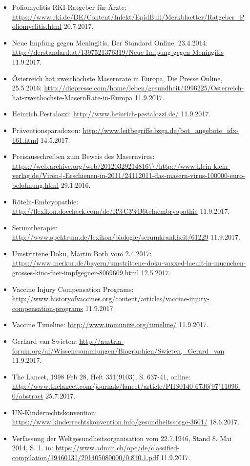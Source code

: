 \documentclass[
    a4paper,
    12pt,
    hyphens,
    chapterprefix=true,
    headheight=33pt,
    footheight=29pt,
    headings=optiontohead, %
]{scrartcl}
\begin{document}
{\begin{itemize}
\item{Poliomyelitis RKI-Ratgeber für Ärzte: \url{https://www.rki.de/DE/Content/Infekt/EpidBull/Merkblaetter/Ratgeber_Poliomyelitis.html} 20.7.2017.}
\item{Neue Impfung gegen Meningitis, Der Standard Online, 23.4.2014: \url{http://derstandard.at/1397521376319/Neue-Imfpung-gegen-Meningitis} 11.9.2017.}
\item{Österreich hat zweithöchste Masernrate in Europa, Die Presse Online, 25.5.2016: \url{http://diepresse.com/home/leben/gesundheit/4996225/Osterreich-hat-zweithochste-MasernRate-in-Europa} 11.9.2017.}
\item{Heinrich Pestalozzi: \url{http://www.heinrich-pestalozzi.de/} 11.9.2017.}
\item{Präventionsparadoxon: \url{http://www.leitbegriffe.bzga.de/bot_angebote_idx-161.html} 14.5.2017.}
\item{Preisausschreiben zum Beweis des Masernvirus: \url{https://web.archive.org/web/20120329214816\\/http://www.klein-klein-verlag.de/Viren-|-Erschienen-in-2011/24112011-das-masern-virus-100000-euro-belohnung.html} 29.1.2016.}
\item{Röteln-Embryopathie: \url{http://flexikon.doccheck.com/de/R\%C3\%B6telnembryopathie} 11.9.2017.}
\item{Serumtherapie: \url{http://www.spektrum.de/lexikon/biologie/serumkrankheit/61229} 11.9.2017.}
\item{Umstrittene Doku, Martin Both vom 2.4.2017: \url{https://www.merkur.de/bayern/umstrittene-doku-vaxxed-laeuft-in-muenchen-grosses-kino-fuer-impfgegner-8069609.html} 12.5.2017.}
\item{Vaccine Injury Compensation Programs: \url{http://www.historyofvaccines.org/content/articles/vaccine-injury-compensation-programs} 11.9.2017.}
\item{Vaccine Timeline: \url{http://www.immunize.org/timeline/} 11.9.2017.}
\item{Gerhard van Swieten: \url{http://austria-forum.org/af/Wissenssammlungen/Biographien/Swieten,_Gerard_van} 11.9.2017.}
\item{The Lancet, 1998 Feb 28, Heft 351(9103), S. 637-41, online: \url{http://www.thelancet.com/journals/lancet/article/PIIS0140-6736(97)11096-0/abstract} 25.7.2017.}
\item{UN-Kinderrechtskonvention: \url{https://www.kinderrechtskonvention.info/gesundheitssorge-3601/} 18.6.2017.}
\item{Verfassung der Weltgesundheitsorganisation vom 22.7.1946, Stand 8. Mai 2014, S. 1. in: \url{https://www.admin.ch/opc/de/classified-compilation/19460131/201405080000/0.810.1.pdf} 11.9.2017.}

\end{itemize}}
\end{document}
